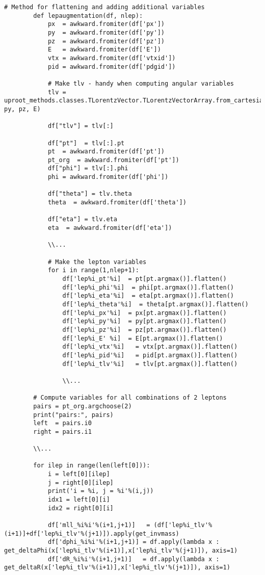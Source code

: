 \documentclass[a4paper, american, 12pt]{report}
\begin{document}
	\begin{lstlisting}[caption=Making new variables., label=Lst:Making_variables]
		# Method for flattening and adding additional variables
		def lepaugmentation(df, nlep):
			px  = awkward.fromiter(df['px'])
			py  = awkward.fromiter(df['py'])
			pz  = awkward.fromiter(df['pz'])
			E   = awkward.fromiter(df['E'])
			vtx = awkward.fromiter(df['vtxid'])
			pid = awkward.fromiter(df['pdgid'])
		
			# Make tlv - handy when computing angular variables
			tlv = uproot_methods.classes.TLorentzVector.TLorentzVectorArray.from_cartesian(px, py, pz, E)
		
			df["tlv"] = tlv[:]
		
			df["pt"]  = tlv[:].pt
			pt  = awkward.fromiter(df['pt'])
			pt_org  = awkward.fromiter(df['pt'])
			df["phi"] = tlv[:].phi
			phi = awkward.fromiter(df['phi'])
		
			df["theta"] = tlv.theta
			theta  = awkward.fromiter(df['theta'])
		
			df["eta"] = tlv.eta
			eta  = awkward.fromiter(df['eta'])
		
			\\...
		
			# Make the lepton variables
			for i in range(1,nlep+1):
				df['lep%i_pt'%i]  = pt[pt.argmax()].flatten()
				df['lep%i_phi'%i]  = phi[pt.argmax()].flatten()
				df['lep%i_eta'%i]  = eta[pt.argmax()].flatten()
				df['lep%i_theta'%i]  = theta[pt.argmax()].flatten()
				df['lep%i_px'%i]  = px[pt.argmax()].flatten()
				df['lep%i_py'%i]  = py[pt.argmax()].flatten()
				df['lep%i_pz'%i]  = pz[pt.argmax()].flatten()
				df['lep%i_E' %i]  = E[pt.argmax()].flatten()
				df['lep%i_vtx'%i]   = vtx[pt.argmax()].flatten()
				df['lep%i_pid'%i]   = pid[pt.argmax()].flatten()
				df['lep%i_tlv'%i]   = tlv[pt.argmax()].flatten()
		
				\\...
		
		# Compute variables for all combinations of 2 leptons
		pairs = pt_org.argchoose(2)
		print("pairs:", pairs)
		left  = pairs.i0
		right = pairs.i1
		
		\\...
		
		for ilep in range(len(left[0])):
			i = left[0][ilep]
			j = right[0][ilep]
			print('i = %i, j = %i'%(i,j))
			idx1 = left[0][i]
			idx2 = right[0][i]
		
			df['mll_%i%i'%(i+1,j+1)]   = (df['lep%i_tlv'%(i+1)]+df['lep%i_tlv'%(j+1)]).apply(get_invmass)
			df['dphi_%i%i'%(i+1,j+1)] = df.apply(lambda x : get_deltaPhi(x['lep%i_tlv'%(i+1)],x['lep%i_tlv'%(j+1)]), axis=1)
			df['dR_%i%i'%(i+1,j+1)]   = df.apply(lambda x : get_deltaR(x['lep%i_tlv'%(i+1)],x['lep%i_tlv'%(j+1)]), axis=1)
		

\end{lstlisting}
\end{document}
